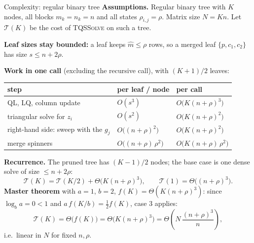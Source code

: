 \documentclass[aspectratio=169,11pt]{beamer}
\begin{document}
\begin{frame}{Complexity: regular binary tree}
\footnotesize
\textbf{Assumptions.} Regular binary tree with $K$ nodes, all blocks $m_k=n_k=n$ and all states
$\rho_{i,j}=\rho$. Matrix size $N=Kn$. Let $\mathcal{T}(K)$ be the cost of \textsc{TQSSolve} on such a tree.

\textbf{Leaf sizes stay bounded:} a leaf keeps $\hat{m}\le\rho$ rows, so a merged leaf $\{p,c_1,c_2\}$ has size $s\le n+2\rho$.

\textbf{Work in one call} (excluding the recursive call), with $(K+1)/2$ leaves:
\begin{center}
\scriptsize
\renewcommand{\arraystretch}{1.1}
\begin{tabular}{@{}lll@{}}
\hline
step & per leaf / node & per call \\
\hline
QL, LQ, column update & $O(s^3)$ & $O\bigl(K(n+\rho)^3\bigr)$ \\
triangular solve for $z_i$ & $O(s^2)$ & $O\bigl(K(n+\rho)^2\bigr)$ \\
right-hand side: sweep with the $g_j$ & $O\bigl((n+\rho)^2\bigr)$ & $O\bigl(K(n+\rho)^2\bigr)$ \\
merge spinners & $O\bigl((n+\rho)\,\rho^2\bigr)$ & $O\bigl(K(n+\rho)\,\rho^2\bigr)$ \\
\hline
\end{tabular}
\end{center}

\textbf{Recurrence.} The pruned tree has $(K-1)/2$ nodes; the base case is one dense solve of size $\le n+2\rho$:
\[
\mathcal{T}(K)=\mathcal{T}(K/2)+\Theta\bigl(K(n+\rho)^3\bigr),\qquad \mathcal{T}(1)=\Theta\bigl((n+\rho)^3\bigr).
\]
\textbf{Master theorem} with $a=1$, $b=2$, $f(K)=\Theta(K(n+\rho)^3)$: since $\log_b a=0<1$ and
$a\,f(K/b)=\tfrac12 f(K)$, case 3 applies:
\[
\mathcal{T}(K)=\Theta\bigl(f(K)\bigr)=\Theta\bigl(K(n+\rho)^3\bigr)=\Theta\!\left(N\,\frac{(n+\rho)^3}{n}\right),
\]
i.e.\ linear in $N$ for fixed $n,\rho$.
\end{frame}
\end{document}
